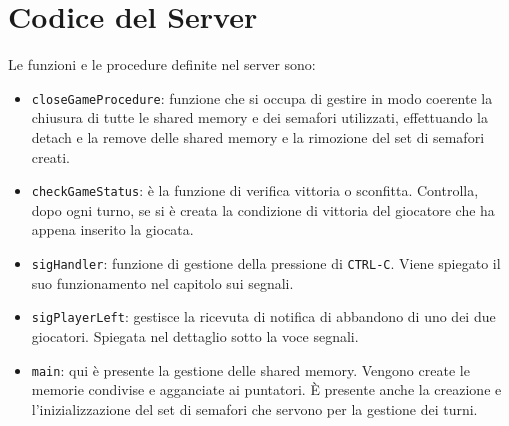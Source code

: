 \documentclass[a4paper,11pt]{article}
\begin{document}
\section{Codice del Server}
Le funzioni e le procedure definite nel server sono:
\begin{itemize}
\item \texttt{closeGameProcedure}: funzione che si occupa di gestire in modo coerente la chiusura di tutte le shared memory e dei semafori utilizzati, effettuando la detach e la remove delle shared memory e la rimozione del set di semafori creati.
\item \texttt{checkGameStatus}: \`e la funzione di verifica vittoria o sconfitta. Controlla, dopo ogni turno, se si è creata la condizione di vittoria del giocatore che ha appena inserito la giocata.
\item \texttt{sigHandler}: funzione di gestione della pressione di \texttt{CTRL-C}. Viene spiegato il suo funzionamento nel capitolo sui segnali.
\item \texttt{sigPlayerLeft}: gestisce la ricevuta di notifica di abbandono di uno dei due giocatori. Spiegata nel dettaglio sotto la voce segnali.
\item \texttt{main}: qui è presente la gestione delle shared memory. Vengono create le memorie condivise e agganciate ai puntatori. È presente anche la creazione e l'inizializzazione del set di semafori che servono per la gestione dei turni.
\end{itemize}
 
\end{document}
